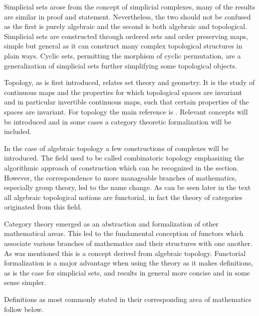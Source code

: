 \documentclass[../../main.tex]{subfiles}
\begin{document}
    Simplicial sets arose from the concept of simplicial complexes, many of the results are similar in proof and statement. Nevertheless, the two should not be confused as the first is purely algebraic and the second is both algebraic and topological. Simplicial sets are constructed through ordered sets and order preserving maps, simple but general as it can construct many complex topological structures in plain ways. Cyclic sets, permitting the morphism of cyclic permutation, are a generalization of simplicial sets further simplifying some topological objects.
    
    Topology, as is first introduced, relates set theory and geometry. It is the study of continuous maps and the properties for which topological spaces are invariant and in particular invertible continuous maps, such that certain properties of the spaces are invariant. For topology the main reference is \cite{armstrong-basictop}. Relevant concepts will be introduced and in some cases a category theoretic formalization will be included. 
    
    In the case of algebraic topology a few constructions of complexes will be introduced. The field used to be called combinatoric topology emphasizing the algorithmic approach of construction which can be recognized in the section. However, the correspondence to more manageable branches of mathematics, especially group theory, led to the name change. As can be seen later in the text all algebraic topological notions are functorial, in fact the theory of categories originated from this field. 
    
    Category theory emerged as an abstraction and formalization of other mathematical areas. This led to the fundamental conception of functors which associate various branches of mathematics and their structures with one another. As was mentioned this is a concept derived from algebraic topology. Functorial formalization is a major advantage when using the theory as it makes definitions, as is the case for simplicial sets, and results in general more concise and in some sense simpler. 
    
    Definitions as most commonly stated in their corresponding area of mathematics follow below. 
    
\end{document}
